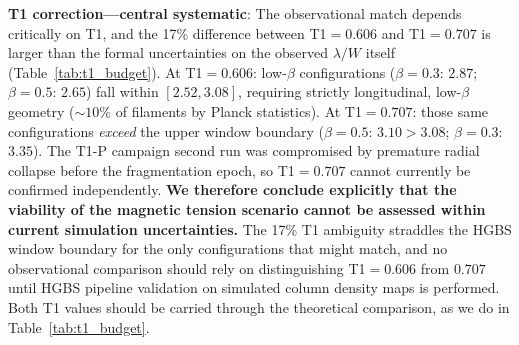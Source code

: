 \documentclass[twoside,twocolumn]{mnras}
\begin{document}
\textbf{T1 correction---central systematic}: The observational match depends critically
on T1, and the 17\% difference between T1$=0.606$ and T1$=0.707$ is larger than the
formal uncertainties on the observed $\lambda/W$ itself (Table~\ref{tab:t1_budget}).
At T1$=0.606$: low-$\beta$ configurations ($\beta=0.3$: $2.87$; $\beta=0.5$: $2.65$)
fall within $[2.52, 3.08]$, requiring strictly longitudinal, low-$\beta$ geometry
(${\sim}10\%$ of filaments by Planck statistics). At T1$=0.707$: those same
configurations \textit{exceed} the upper window boundary ($\beta=0.5$: $3.10 > 3.08$;
$\beta=0.3$: $3.35$). The T1-P campaign second run was compromised by premature radial
collapse before the fragmentation epoch, so T1$=0.707$ cannot currently be confirmed
independently. \textbf{We therefore conclude explicitly that the viability of the
magnetic tension scenario cannot be assessed within current simulation uncertainties.}
The 17\% T1 ambiguity straddles the HGBS window boundary for the only configurations
that might match, and no observational comparison should rely on distinguishing
T1$=0.606$ from $0.707$ until HGBS pipeline validation on simulated column density
maps is performed. Both T1 values should be carried through the theoretical comparison,
as we do in Table~\ref{tab:t1_budget}.
\end{document}

